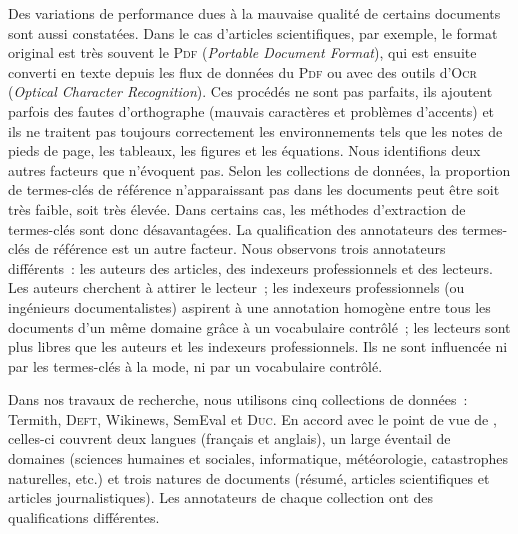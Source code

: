     Des variations de performance dues à la mauvaise qualité de certains
    documents sont aussi constatées. Dans le cas d'articles scientifiques, par
    exemple, le format original est très souvent le \textsc{Pdf}
    (\textit{Portable Document Format}), qui est ensuite converti en texte
    depuis les flux de données du \textsc{Pdf} ou avec des outils d'\textsc{Ocr}
    (\textit{Optical Character Recognition}). Ces procédés ne sont pas parfaits,
    ils ajoutent parfois des fautes d'orthographe (mauvais caractères et
    problèmes d'accents) et ils ne traitent pas toujours correctement les
    environnements tels que les notes de pieds de page, les tableaux, les
    figures et les équations. Nous identifions deux autres facteurs que
     n'évoquent pas. Selon les collections de
    données, la proportion de termes-clés de référence n'apparaissant pas dans
    les documents peut être soit très faible, soit très élevée. Dans certains
    cas, les méthodes d'extraction de termes-clés sont donc désavantagées. La
    qualification des annotateurs des termes-clés de référence est un autre
    facteur. Nous observons trois annotateurs différents~: les auteurs des
    articles, des indexeurs professionnels et des lecteurs. Les auteurs
    cherchent à attirer le lecteur~; les indexeurs professionnels (ou ingénieurs
    documentalistes) aspirent à une annotation homogène entre tous les documents
    d'un même domaine grâce à un vocabulaire contrôlé~; les lecteurs sont plus
    libres que les auteurs et les indexeurs professionnels. Ils ne sont
    influencée ni par les termes-clés \og{}à la mode\fg{}, ni par un vocabulaire
    contrôlé.

    Dans nos travaux de recherche, nous utilisons cinq collections de données~:
    Termith, \textsc{Deft}, Wikinews, SemEval et \textsc{Duc}. En accord avec le
    point de vue de , celles-ci couvrent deux
    langues (français et anglais), un large éventail de domaines (sciences
    humaines et sociales, informatique, météorologie, catastrophes naturelles,
    etc.) et trois natures de documents (résumé, articles scientifiques et
    articles journalistiques). Les annotateurs de chaque collection ont
    des qualifications différentes.


